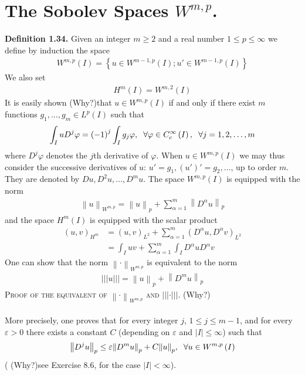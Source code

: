 \documentclass[a4paper,oneside]{book}
\numberwithin{equation}{chapter}
\begin{document}
\section*{The Sobolev Spaces $W^{m,p}$.}
\textbf{Definition 1.34.} Given an integer $m\ge 2$ and a real number $1\le p\le \infty$ we define by induction the space
\begin{align}
{W^{m,p}}\left( I \right) = \left\{ {u \in {W^{m - 1,p}}\left( I \right);u' \in {W^{m - 1,p}}\left( I \right)} \right\}
\end{align}
We also set
\begin{align}
{H^m}\left( I \right) = {W^{m,2}}\left( I \right)
\end{align}
It is easily shown  (Why?)that $u\in W^{m,p}\left(I\right)$ if and only if there exist $m$ functions $g_1,\ldots,g_m\in L^p\left(I\right)$ such that
\begin{align}
\int_I {u{D^j}\varphi }  = {\left( { - 1} \right)^j}\int_I {{g_j}\varphi } ,\hspace{0.2cm}\forall \varphi  \in C_c^\infty \left( I \right), \hspace{0.2cm}\forall j = 1,2, \ldots ,m
\end{align}
where $D^j \varphi$ denotes the $j$th derivative of $\varphi$. When $u\in W^{m,p}\left(I\right)$ we may thus consider the successive derivatives of $u$: $u' = {g_1},\left( {u'} \right)' = {g_2}, \ldots $, up to order $m$. They are denoted by $Du,D^2u,\ldots,D^mu$. The space $W^{m,p}\left(I\right)$ is equipped with the norm
\begin{align}
{\left\| u \right\|_{{W^{m,p}}}} = {\left\| u \right\|_p} + \sum\limits_{\alpha  = 1}^m {{{\left\| {{D^\alpha }u} \right\|}_p}} 
\end{align}
and the space $H^m\left(I\right)$ is equipped with the scalar product
\begin{align}
{\left( {u,v} \right)_{{H^m}}} &= {\left( {u,v} \right)_{{L^2}}} + \sum\limits_{\alpha  = 1}^m {{{\left( {{D^\alpha }u,{D^\alpha }v} \right)}_{{L^2}}}} \\
& = \int_I {uv}  + \sum\limits_{\alpha  = 1}^m {\int_I {{D^\alpha }u{D^\alpha }v} } 
\end{align}
One can show that the norm ${\left\|  \cdot  \right\|_{{W^{m,p}}}}$ is equivalent to the norm
\begin{align}
|||u||| = {\left\| u \right\|_p} + {\left\| {{D^m}u} \right\|_p}
\end{align}
\textsc{Proof of the equivalent of ${\left\|  \cdot  \right\|_{{W^{m,p}}}}$ and $|||\cdot|||$.}  (Why?)\\
\\
More precisely, one proves that for every integer $j$, $1\le j\le m-1$, and for every $\varepsilon >0$ there exists a constant $C$ (depending on $\varepsilon$ and $\left| I \right| \le \infty $)  such that
\begin{align}
{\left\| {{D^j}u} \right\|_p} \le \varepsilon {\left\| {{D^m}u} \right\|_p} + C{\left\| u \right\|_p},\hspace{0.2cm}\forall u \in {W^{m,p}}\left( I \right)
\end{align}
( (Why?)see Exercise 8.6, \cite{1} for the case $\left| I \right| < \infty $).
\end{document}
